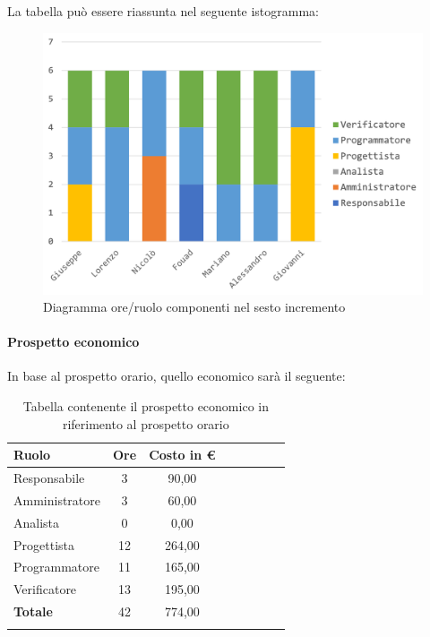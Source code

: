 			La tabella può essere riassunta nel seguente istogramma:
			\begin{figure}[H]
				\centering
				\includegraphics[width=0.8\linewidth]{./images/preventivo/incremento6-1.png}
				\caption{Diagramma ore/ruolo componenti nel sesto incremento}
				\label{fig:diagramma suddivione ruoli incremento VI}
			\end{figure}
		\pagebreak
			
			\paragraph{Prospetto economico}
			In base al prospetto orario, quello economico sarà il seguente: 
			
			\begin{longtable}{|l|c|c|c|c|c|c|c|}
				\hline
				\rowcolor{lighter-grayer}
				\textbf{Ruolo} & \textbf{Ore} & \textbf{Costo in € } \\
				\hline
				\endfirsthead
				
				\hline
				Responsabile 	    & 3 & 90,00\\
				\hline 
				\hline
				Amministratore	   & 3 & 60,00\\
				\hline
				\hline
				Analista 				& 0 & 0,00\\
				\hline
				\hline
				Progettista 		   & 12 & 264,00\\
				\hline
				\hline
				Programmatore 	  & 11 & 165,00\\
				\hline
				\hline
				Verificatore 		   & 13 & 195,00\\
				\hline
				\textbf{Totale} 	 & 42 & 774,00\\
				\hline
				\caption{Tabella contenente il prospetto economico in riferimento al prospetto orario}
			\end{longtable}
			
